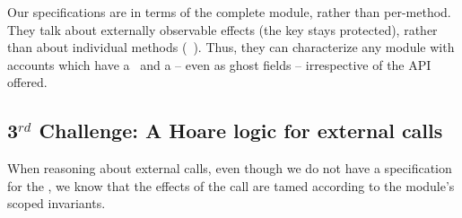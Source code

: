  \noindent
 Our specifications are  in terms of the complete module, rather than per-method.
 They talk about externally observable effects (\eg the key stays protected), 
 rather than about  individual methods (\eg\, ). %
{Thus,  %
  they can characterize  any 
module with  accounts which have a %
 \balance~and a \password -- even as ghost fields --}  irrespective of the API offered.

  
  \subsection{3$^{rd}$ Challenge:  A Hoare logic for external calls} %
 \label{sec:howThird}
 
 When reasoning about external calls, even though we do not have a specification for the , we know that the effects of the call are tamed according to the module's scoped invariants. 
% 
%
 
